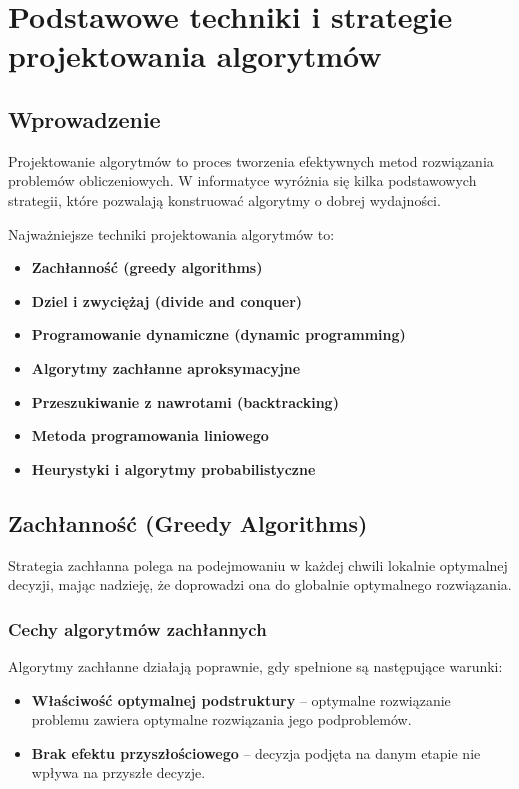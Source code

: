 \section{Podstawowe techniki i strategie projektowania algorytmów}

\subsection{Wprowadzenie}
Projektowanie algorytmów to proces tworzenia efektywnych metod rozwiązania problemów obliczeniowych. W informatyce wyróżnia się kilka podstawowych strategii, które pozwalają konstruować algorytmy o dobrej wydajności.

Najważniejsze techniki projektowania algorytmów to:
\begin{itemize}
    \item \textbf{Zachłanność (greedy algorithms)}
    \item \textbf{Dziel i zwyciężaj (divide and conquer)}
    \item \textbf{Programowanie dynamiczne (dynamic programming)}
    \item \textbf{Algorytmy zachłanne aproksymacyjne}
    \item \textbf{Przeszukiwanie z nawrotami (backtracking)}
    \item \textbf{Metoda programowania liniowego}
    \item \textbf{Heurystyki i algorytmy probabilistyczne}
\end{itemize}

\subsection{Zachłanność (Greedy Algorithms)}
Strategia zachłanna polega na podejmowaniu w każdej chwili lokalnie optymalnej decyzji, mając nadzieję, że doprowadzi ona do globalnie optymalnego rozwiązania.

\subsubsection{Cechy algorytmów zachłannych}
Algorytmy zachłanne działają poprawnie, gdy spełnione są następujące warunki:
\begin{itemize}
    \item \textbf{Właściwość optymalnej podstruktury} – optymalne rozwiązanie problemu zawiera optymalne rozwiązania jego podproblemów.
    \item \textbf{Brak efektu przyszłościowego} – decyzja podjęta na danym etapie nie wpływa na przyszłe decyzje.
\end{itemize}

